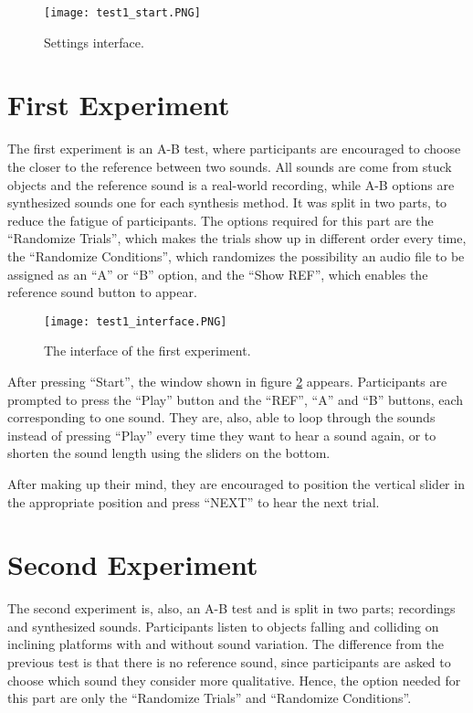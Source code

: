 \begin{figure}[H]
  \centering
    \texttt{[image: test1\_start.PNG]}
        \caption{Settings interface.}
        \label{fig:exp_start}
\end{figure}

\section*{First Experiment}
The first experiment is an A-B test, where participants are encouraged to choose the closer to the reference between two sounds. All sounds are come from stuck objects and the reference sound is a real-world recording, while A-B options are synthesized sounds one for each synthesis method. It was split in two parts, to reduce the fatigue of participants. The options required for this part are the ``Randomize Trials'', which makes the trials show up in different order every time, the ``Randomize Conditions'', which randomizes the possibility an audio file to be assigned as an ``A'' or ``B'' option, and the ``Show REF'', which enables the reference sound button to appear. 

\begin{figure}[H]
    \centering  
     \texttt{[image: test1\_interface.PNG]}
        \caption{The interface of the first experiment.}
        \label{fig:t1_ui}
\end{figure}

After pressing ``Start'', the window shown in figure \ref{fig:t1_ui} appears. Participants are prompted to press the ``Play'' button and the ``REF'', ``A'' and ``B'' buttons, each corresponding to one sound. They are, also, able to loop through the sounds instead of pressing ``Play'' every time they want to hear a sound again, or to shorten the sound length using the sliders on the bottom. 

After making up their mind, they are encouraged to position the vertical slider in the appropriate position and press ``NEXT'' to hear the next trial.

\section*{Second Experiment}
The second experiment is, also, an A-B test and is split in two parts; recordings and synthesized sounds. Participants listen to objects falling and colliding on inclining platforms with and without sound variation. The difference from the previous test is that there is no reference sound, since participants are asked to choose which sound they consider more qualitative. Hence, the option needed for this part are only the ``Randomize Trials'' and ``Randomize Conditions''.

